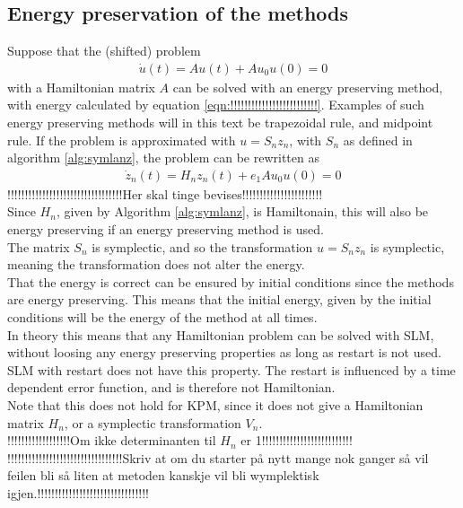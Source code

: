 \subsection{Energy preservation of the methods} %
Suppose that the (shifted) problem 
\begin{equation}
\begin{aligned}
\dot{u}(t) = Au(t) + Au_0
u(0) = 0
\end{aligned}
\end{equation}
with a Hamiltonian matrix $A$ can be solved with an energy preserving method, with energy calculated by equation \eqref{eqn:!!!!!!!!!!!!!!!!!!!!!!!!!}. Examples of such energy preserving methods will in this text be trapezoidal rule, and midpoint rule. If the problem is approximated with $u = S_n z_n $, with $S_n$ as defined in algorithm \ref{alg:symlanz}, the problem can be rewritten as
\begin{equation}
\begin{aligned}
\dot{z}_n(t) = H_n z_n(t) + e_1 A u_0
u(0) = 0
\end{aligned}
\end{equation}
!!!!!!!!!!!!!!!!!!!!!!!!!!!!!!!!!Her skal tinge bevises!!!!!!!!!!!!!!!!!!!!!!!\\
Since $H_n$, given by Algorithm \ref{alg:symlanz}, is Hamiltonain, this will also be energy preserving if an energy preserving method is used. \\
The matrix $S_n$ is symplectic, and so the transformation $u = S_n z_n $ is symplectic, meaning the transformation does not alter the energy. \\ 
That the energy is correct can be ensured by initial conditions since the methods are energy preserving. This means that the initial energy, given by the initial conditions will be the energy of the method at all times. \\

In theory this means that any Hamiltonian problem can be solved with SLM, without loosing any energy preserving properties as long as restart is not used. \\

SLM with restart does not have this property. The restart is influenced by a time dependent error function, and is therefore not Hamiltonian. \\

Note that this does not hold for KPM, since it does not give a Hamiltonian matrix $H_n$, or a symplectic transformation $V_n$. 
\\!!!!!!!!!!!!!!!!!!Om ikke determinanten til $H_n$ er 1!!!!!!!!!!!!!!!!!!!!!!!!!!\\
!!!!!!!!!!!!!!!!!!!!!!!!!!!!!!!!!Skriv at om du starter på nytt mange nok ganger så vil feilen bli så liten at metoden kanskje vil bli wymplektisk igjen.!!!!!!!!!!!!!!!!!!!!!!!!!!!!!!!!
